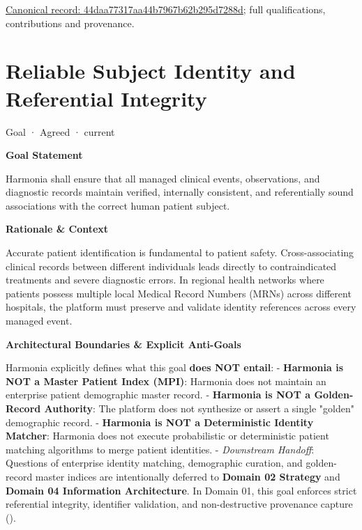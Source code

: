 {\footnotesize \href{../../../../continuum/motivation/goal/44daa77317aa44b7967b62b295d7288d.md}{Canonical record: 44daa77317aa44b7967b62b295d7288d}; full qualifications, contributions and provenance.}\par
\section{Reliable Subject Identity and Referential Integrity}

\label{element:e2f8b62e2cbd486282d68b6009c06de6}
{\small Goal · Agreed · current}\par

\par\medskip\textbf{Goal Statement}\par


Harmonia shall ensure that all managed clinical events, observations, and diagnostic records maintain verified, internally consistent, and referentially sound associations with the correct human patient subject.



\par\medskip\textbf{Rationale \& Context}\par


Accurate patient identification is fundamental to patient safety. Cross-associating clinical records between different individuals leads directly to contraindicated treatments and severe diagnostic errors. In regional health networks where patients possess multiple local Medical Record Numbers (MRNs) across different hospitals, the platform must preserve and validate identity references across every managed event.



\par\medskip\textbf{Architectural Boundaries \& Explicit Anti-Goals}\par


Harmonia explicitly defines what this goal \textbf{does NOT entail}:
- \textbf{Harmonia is NOT a Master Patient Index (MPI)}: Harmonia does not maintain an enterprise patient demographic master record.
- \textbf{Harmonia is NOT a Golden-Record Authority}: The platform does not synthesize or assert a single "golden" demographic record.
- \textbf{Harmonia is NOT a Deterministic Identity Matcher}: Harmonia does not execute probabilistic or deterministic patient matching algorithms to merge patient identities.
- \emph{Downstream Handoff}: Questions of enterprise identity matching, demographic curation, and golden-record master indices are intentionally deferred to \textbf{Domain 02 Strategy} and \textbf{Domain 04 Information Architecture}. In Domain 01, this goal enforces strict referential integrity, identifier validation, and non-destructive provenance capture (\href{\detokenize{../../../../../docs/markdown/01-motivation/requirements-constraints/foundational-requirements.md}}{\texttt{}}).


